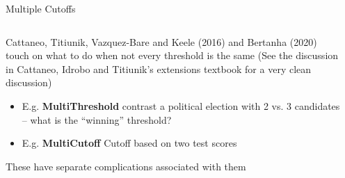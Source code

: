 \documentclass[notes,11pt, aspectratio=169]{beamer}
\newenvironment{wideitemize}{\itemize\addtolength{\itemsep}{10pt}}{\enditemize}
\begin{document}
\begin{frame}{Multiple Cutoffs}
    \begin{columns}[onlytextwidth, T] %
      \begin{column}{.6\textwidth}
  \begin{wideitemize}
  \item Cattaneo, Titiunik, Vazquez-Bare and Keele (2016) and Bertanha
    (2020) touch on what to do when not every threshold is the same
    (See the discussion in Cattaneo, Idrobo and Titiunik's extensions
    textbook for a very clean discussion)
    \begin{itemize} 
    \item E.g. \textbf{MultiThreshold} contrast a political election with 2 vs. 3 candidates
      -- what is the ``winning'' threshold?
    \item E.g. \textbf{MultiCutoff} Cutoff based on two test scores
    \end{itemize}
  \item These have separate complications associated with them
  \end{wideitemize}
  \end{column}
      \begin{column}{.4\textwidth}

\end{column}
\end{columns}
\end{frame}
\end{document}
